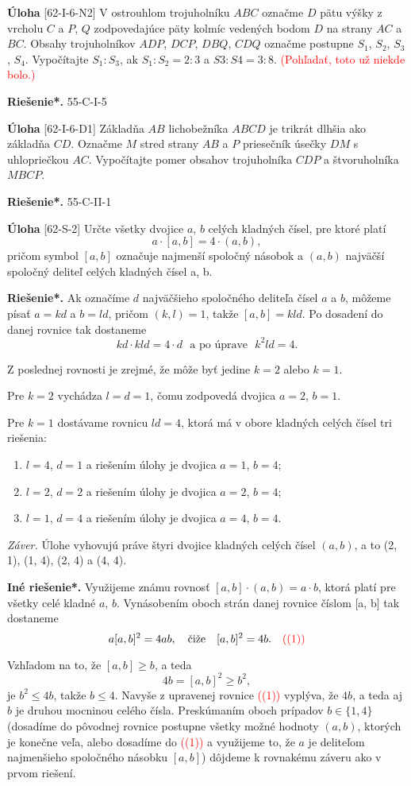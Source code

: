 \documentclass{article}
\newcommand{\rieh}{\textbf{Riešenie*.} }
\newcommand\todo[1]{\noindent\textcolor{red}{(#1)}}
\newcommand{\problem}[3]{
  \begin{tcolorbox}[breakable,notitle,boxrule=0pt,colback=light-gray,colframe=light-gray]
    \textbf{Úloha}
    [#1] #2
  \end{tcolorbox}
  \noindent#3
}
\begin{document}
\problem{62-I-6-N2}{
V ostrouhlom trojuholníku $ABC$ označme $D$ pätu výšky z vrcholu $C$ a $P$, $Q$ zodpovedajúce päty kolmíc vedených bodom $D$ na strany $AC$ a $BC$. Obsahy trojuholníkov $ADP$, $DCP$, $DBQ$, $CDQ$ označme postupne $S_1$, $S_2$, $S_3$, $S_4$. Vypočítajte $S_1 : S_3$, ak $S_1 : S_2 = 2 : 3$ a $S3 : S4 = 3 : 8$. \todo{Pohľadať, toto už niekde bolo.}
}{
\rieh 55-C-I-5
}


\problem{62-I-6-D1}{
Základňa $AB$ lichobežníka $ABCD$ je trikrát dlhšia ako základňa $CD$. Označme $M$ stred strany $AB$ a $P$ priesečník úsečky $DM$ s uhlopriečkou $AC$. Vypočítajte pomer obsahov trojuholníka $CDP$ a štvoruholníka $MBCP$.
}{
\rieh 55-C-II-1
}


\problem{62-S-2}{
Určte všetky dvojice $a$, $b$ celých kladných čísel, pre ktoré platí
$$a \cdot [a, b] = 4 \cdot (a, b),$$
pričom symbol $[a, b]$ označuje najmenší spoločný násobok a $(a, b)$ najväčší spoločný deliteľ celých kladných čísel a, b. 
}{
\rieh Ak označíme $d$ najväčšieho spoločného deliteľa čísel $a$ a $b$, môžeme písať $a = kd$ a $b = ld$, pričom $(k, l) = 1$, takže $[a, b] = kld$. Po dosadení do danej rovnice tak dostaneme
$$kd \cdot kld = 4 \cdot d \ \ \ \text{a po úprave} \ \ \ k^2ld = 4.$$

Z poslednej rovnosti je zrejmé, že môže byť jedine $k = 2$ alebo $k = 1$.

Pre $k = 2$ vychádza $l = d = 1$, čomu zodpovedá dvojica $a = 2$, $b = 1$.

Pre $k = 1$ dostávame rovnicu $ld = 4$, ktorá má v obore kladných celých čísel tri riešenia:
\begin{enumerate}
    \item $l = 4$, $d = 1$ a riešením úlohy je dvojica $a = 1$, $b = 4$;
    \item $l = 2$, $d = 2$ a riešením úlohy je dvojica $a = 2$, $b = 4$;
    \item $l = 1$, $d = 4$ a riešením úlohy je dvojica $a = 4$, $b = 4$.
\end{enumerate}
\textit{Záver.} Úlohe vyhovujú práve štyri dvojice kladných celých čísel $(a, b)$, a to (2, 1), (1, 4),
(2, 4) a (4, 4).

\textbf{Iné riešenie*.} Využijeme známu rovnosť $[a, b] \cdot (a, b) = a \cdot b$, ktorá platí pre všetky celé kladné $a$, $b$. Vynásobením oboch strán danej rovnice číslom [a, b] tak dostaneme
$$a[a, b]^2= 4ab, \ \ \ \text{čiže} \ \ \ [a, b]^2= 4b. \ \ \ \todo{ (1)}$$

Vzhľadom na to, že $[a, b] \geq b$, a teda 
$$4b = [a, b]^2 \geq b^2,$$
je $b^2\leq  4b$, takže $b \leq 4$. Navyše z upravenej rovnice \todo{(1)} vyplýva, že $4b$, a teda aj $b$ je druhou mocninou celého čísla. Preskúmaním oboch prípadov $b \in \{1, 4\}$ (dosadíme do pôvodnej rovnice postupne všetky možné hodnoty $(a, b)$, ktorých je konečne veľa, alebo dosadíme do \todo{(1)} a využijeme to, že $a$ je deliteľom najmenšieho spoločného násobku $[a, b]$) dôjdeme k rovnakému záveru ako v prvom riešení.

}
\end{document}
